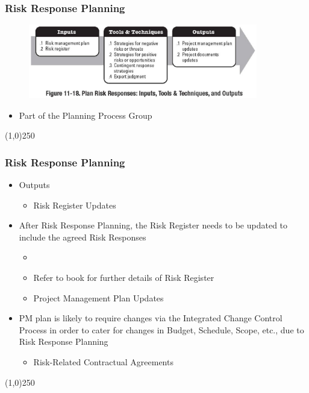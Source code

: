\begin{frame}
\frametitle{Risk Response Planning}
\begin{figure}
	\centering
		\includegraphics[width = 10cm]{images/Fig11-18.jpg}
	\label{fig:11-18}
\end{figure}
\begin{itemize}
\item Part of the Planning Process Group
\end{itemize}
\end{frame}\begin{center}\line(1,0){250}\end{center}



\begin{frame}
\frametitle{Risk Response Planning}
\begin{itemize}
\item Outputs
\begin{itemize}
	\item Risk Register Updates
\end{itemize}
\item After Risk Response Planning, the Risk Register needs to be updated to include the agreed Risk Responses
\begin{itemize}
	\item \item Refer to book for further details of Risk Register
\item Project Management Plan Updates
\end{itemize}
\item PM plan is likely to require changes via the Integrated Change Control Process in order to cater for changes in Budget, Schedule, Scope, etc., due to Risk Response Planning
\begin{itemize}
	\item Risk-Related Contractual Agreements
\end{itemize}
\end{itemize}
\end{frame}\begin{center}\line(1,0){250}\end{center}



